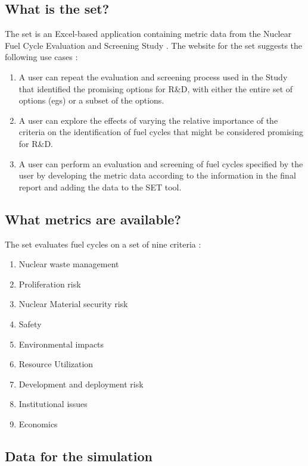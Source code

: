 \subsection{What is the \ac{set}?}

The \ac{set} is an Excel-based application containing metric data from the Nuclear Fuel Cycle Evaluation and Screening Study
\cite{wigeland_nuclear_2014}. The website for the \ac{set} suggests the following use cases \cite{pincock_screening_2014}:
\begin{enumerate}
    \item A user can repeat the evaluation and screening process used in the Study that identified the promising options for R\&D, with either the entire set of options (\acp{eg}) or a subset of the options.
    \item A user can explore the effects of varying the relative importance of the criteria on the identification of fuel cycles that might be considered promising for R\&D.
    \item A user can perform an evaluation and screening of fuel cycles specified by the user by developing the metric data according to the information in the final report and adding the data to the SET tool.
\end{enumerate}

\subsection{What metrics are available?}

The \ac{set} evaluates fuel cycles on a set of nine criteria \cite{wigeland_nuclear_2014}:
\begin{enumerate}
    \item Nuclear waste management
    \item Proliferation risk
    \item Nuclear Material security risk
    \item Safety
    \item Environmental impacts
    \item Resource Utilization
    \item Development and deployment risk
    \item Institutional issues
    \item Economics
\end{enumerate}

\subsection{Data for the simulation}

